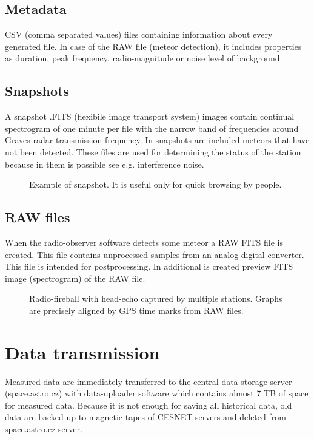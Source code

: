 \documentclass[10pt,a4paper,twoside,dvips]{article}
\begin{document}
\begin{IMCpaper}
\subsection{Metadata}
CSV (comma separated values) files containing information about every generated file. In case of the RAW file (meteor detection), it includes properties as duration, peak frequency, radio-magnitude or noise level of background.                                             

\subsection{Snapshots}
A snapshot .FITS (flexibile image transport system) images contain continual spectrogram of one minute per file with the narrow band of frequencies around Graves radar transmission frequency. In snapshots are included meteors that have not been detected. These files are used for determining the status of the station because in them is possible see e.g. interference noise.                                                      
\begin{figure}[htb]
\centering
{}
\caption{Example of snapshot. It is useful only for quick browsing by people.}%
\label{snap}
\end{figure}


\subsection{RAW files}
When the radio-observer software detects some meteor a RAW FITS file is created. This file contains unprocessed samples from an analog-digital converter. This file is intended for postprocessing. In additional is created preview FITS image (spectrogram) of the RAW file. 

\begin{figure}[htb]
\centering
{}
\caption{Radio-fireball with head-echo captured by multiple stations. Graphs are precisely aligned by GPS time marks from RAW files.}%
\label{mb}
\end{figure}

\section{Data transmission}
Measured data are immediately transferred to the central data storage server  (space.astro.cz) with data-uploader software which contains almost 7 TB of space for measured data. Because it is not enough for saving all historical data, old data are backed up to magnetic tapes of CESNET servers and deleted from space.astro.cz server.                                                                                 


\end{IMCpaper}
\end{document}
